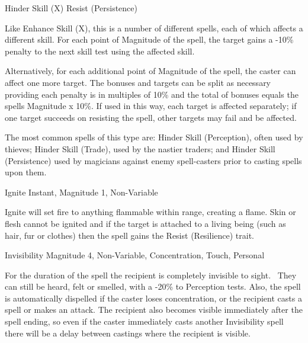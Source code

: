 \begin{rpg-spell}
{Hinder Skill (X)}
{Resist (Persistence)}

Like Enhance Skill (X), this is a number of different spells, each of which affects a different skill. For each point of Magnitude of the spell, the target gains a -10\% penalty to the next skill test using the affected skill.

Alternatively, for each additional point of Magnitude of the spell, the caster can affect one more target.  The bonuses and targets can be split as necessary providing each penalty is in multiples of 10\% and the total of bonuses equals the spells Magnitude x 10\%. If used in this way, each target is affected separately; if one target succeeds on resisting the spell, other targets may fail and be affected.

The most common spells of this type are: Hinder Skill (Perception), often used by thieves; Hinder Skill (Trade), used by the nastier traders; and Hinder Skill (Persistence) used by magicians against enemy spell-casters prior to casting spells upon them.
\end{rpg-spell}


\begin{rpg-spell}
{Ignite}
{Instant, Magnitude 1, Non-Variable}

Ignite will set fire to anything flammable within range, creating a flame. Skin or flesh cannot be ignited and if the target is attached to a living being (such as hair, fur or clothes) then the spell gains the Resist (Resilience) trait. 
\end{rpg-spell}


\begin{rpg-spell}
{Invisibility}
{Magnitude 4, Non-Variable, Concentration, Touch, Personal}

For the duration of the spell the recipient is completely invisible to sight.  They can still be heard, felt or smelled, with a -20\% to Perception tests. Also, the spell is automatically dispelled if the caster loses concentration, or the recipient casts a spell or makes an attack. The recipient also becomes visible immediately after the spell ending, so even if the caster immediately casts another Invisibility spell there will be a delay between castings where the recipient is visible.
\end{rpg-spell}


